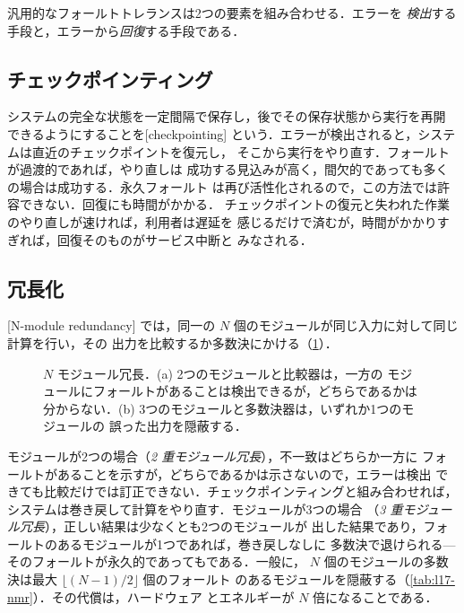 \documentclass[../main.tex]{subfiles}
\begin{document}
汎用的なフォールトトレランスは2つの要素を組み合わせる．エラーを
\emph{検出}する手段と，エラーから\emph{回復}する手段である．

\subsection{チェックポインティング}

システムの完全な状態を一定間隔で保存し，後でその保存状態から実行を再開
できるようにすることを[checkpointing]%
という．エラーが検出されると，システムは直近のチェックポイントを復元し，
そこから実行をやり直す．フォールトが過渡的であれば，やり直しは
成功する見込みが高く，間欠的であっても多くの場合は成功する．永久フォールト
は再び活性化されるので，この方法では許容できない．回復にも時間がかかる．
チェックポイントの復元と失われた作業のやり直しが速ければ，利用者は遅延を
感じるだけで済むが，時間がかかりすぎれば，回復そのものがサービス中断と
みなされる．

\subsection{冗長化}

\begin{definition}[$N$ モジュール冗長]
  [N-module redundancy]%
  では，同一の $N$ 個のモジュールが同じ入力に対して同じ計算を行い，その
  出力を比較するか多数決にかける（\cref{fig:l17-nmr}）．
\end{definition}

\begin{figure}[htbp]
  \centering
  
  \caption{$N$ モジュール冗長．(a) 2つのモジュールと比較器は，一方の
    モジュールにフォールトがあることは検出できるが，どちらであるかは
    分からない．(b) 3つのモジュールと多数決器は，いずれか1つのモジュールの
    誤った出力を隠蔽する．}
  \label{fig:l17-nmr}
\end{figure}

モジュールが2つの場合（\emph{2 重モジュール冗長}），不一致はどちらか一方に
フォールトがあることを示すが，どちらであるかは示さないので，エラーは検出
できても比較だけでは訂正できない．チェックポインティングと組み合わせれば，
システムは巻き戻して計算をやり直す．モジュールが3つの場合
（\emph{3 重モジュール冗長}），正しい結果は少なくとも2つのモジュールが
出した結果であり，フォールトのあるモジュールが1つであれば，巻き戻しなしに
多数決で退けられる---そのフォールトが永久的であってもである．一般に，
$N$ 個のモジュールの多数決は最大 $\lfloor (N-1)/2 \rfloor$ 個のフォールト
のあるモジュールを隠蔽する（\cref{tab:l17-nmr}）．その代償は，ハードウェア
とエネルギーが $N$ 倍になることである．
\end{document}
